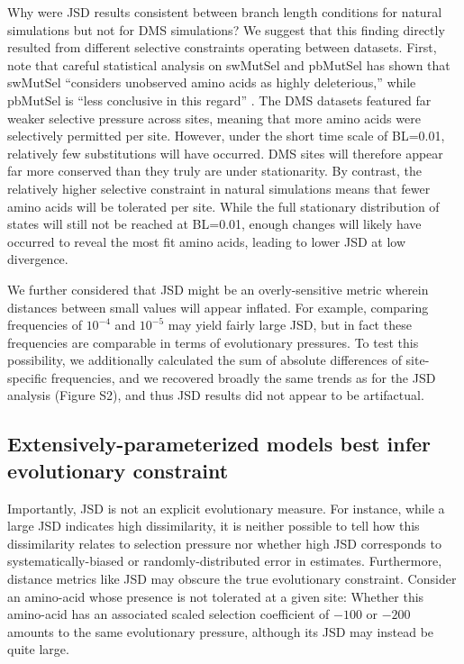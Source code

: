 \documentclass[11pt]{article}
\begin{document}
Why were JSD results consistent between branch length conditions for natural simulations but not for DMS simulations? We suggest that this finding directly resulted from different selective constraints operating between datasets. First, note that careful statistical analysis on swMutSel and pbMutSel has shown that swMutSel ``considers unobserved amino acids as highly deleterious,'' while  pbMutSel is ``less conclusive in this regard'' \citep{Rodrigue2013}. The DMS datasets featured far weaker selective pressure across sites, meaning that more amino acids were selectively permitted per site. However, under the short time scale of BL=0.01, relatively few substitutions will have occurred. DMS sites will therefore appear far more conserved than they truly are under stationarity. By contrast, the relatively higher selective constraint in natural simulations means that fewer amino acids will be tolerated per site. While the full stationary distribution of states will still not be reached at BL=0.01, enough changes will likely have occurred to reveal the most fit amino acids, leading to lower JSD at low divergence.

We further considered that JSD might be an overly-sensitive metric wherein distances between small values will appear inflated. For example, comparing frequencies of $10^{-4}$ and $10^{-5}$ may yield fairly large JSD, but in fact these frequencies are comparable in terms of evolutionary pressures. To test this possibility, we additionally calculated the sum of absolute differences of site-specific frequencies, and we recovered broadly the same trends as for the JSD analysis (Figure S2), and thus JSD results did not appear to be artifactual.

\subsection*{Extensively-parameterized models best infer evolutionary constraint}

Importantly, JSD is not an explicit evolutionary measure. For instance, while a large JSD indicates high dissimilarity, it is neither possible to tell how this dissimilarity relates to selection pressure nor whether high JSD corresponds to systematically-biased or randomly-distributed error in estimates. Furthermore, distance metrics like JSD may obscure the true evolutionary constraint. Consider an amino-acid whose presence is not tolerated at a given site: Whether this amino-acid has an associated scaled selection coefficient of $-100$ or $-200$ amounts to the same evolutionary pressure, although its JSD may instead be quite large.
\end{document}
